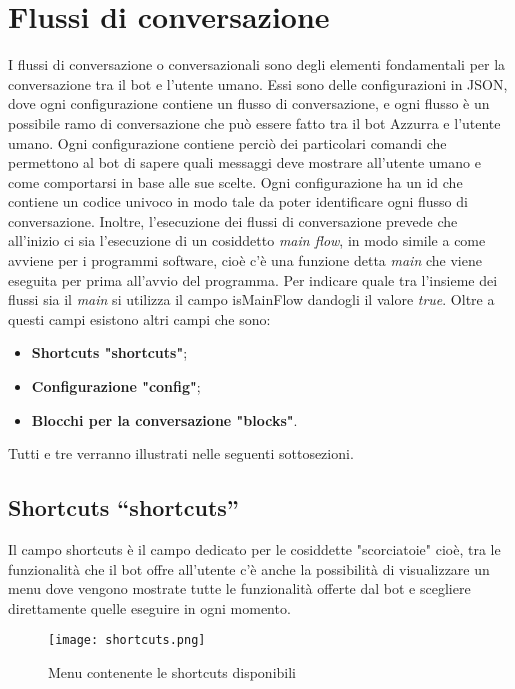\section{Flussi di conversazione}
I flussi di conversazione o conversazionali sono degli elementi fondamentali per la conversazione tra il \gls{bot}\ap{[g]} e l'utente umano. Essi sono delle configurazioni in JSON, dove ogni configurazione contiene un flusso di conversazione, e ogni flusso è un possibile ramo di conversazione che può essere fatto tra il \gls{bot}\ap{[g]} Azzurra e l'utente umano. Ogni configurazione contiene perciò dei particolari comandi che permettono al \gls{bot}\ap{[g]} di sapere quali messaggi deve mostrare all'utente umano e come comportarsi in base alle sue scelte. Ogni configurazione ha un id che contiene un codice univoco in modo tale da poter identificare ogni flusso di conversazione. Inoltre, l'esecuzione dei flussi di conversazione prevede che all'inizio ci sia l'esecuzione di un cosiddetto \emph{main flow}, in modo simile a come avviene per i programmi software, cioè c'è una funzione detta \emph{main} che viene eseguita per prima all'avvio del programma. Per indicare quale tra l'insieme dei flussi sia il \emph{main} si utilizza il campo isMainFlow dandogli il valore \emph{true}.
Oltre a questi campi esistono altri campi che sono:\\
\begin{itemize}
	\item \textbf{Shortcuts "shortcuts"};
	\item \textbf{Configurazione "config"};
	\item \textbf{Blocchi per la conversazione "blocks"}.
\end{itemize}
Tutti e tre verranno illustrati nelle seguenti sottosezioni.
\subsection{Shortcuts “shortcuts”}
Il campo shortcuts è il campo dedicato per le cosiddette "scorciatoie" cioè, tra le funzionalità che il \gls{bot}\ap{[g]} offre all'utente c'è anche la possibilità di visualizzare un menu dove vengono mostrate tutte le funzionalità offerte dal \gls{bot}\ap{[g]} e scegliere direttamente quelle eseguire in ogni momento.

\begin{figure}[htbp]
	\centering
	\texttt{[image: shortcuts.png]}
	\caption{Menu contenente le shortcuts disponibili}
\end{figure}

